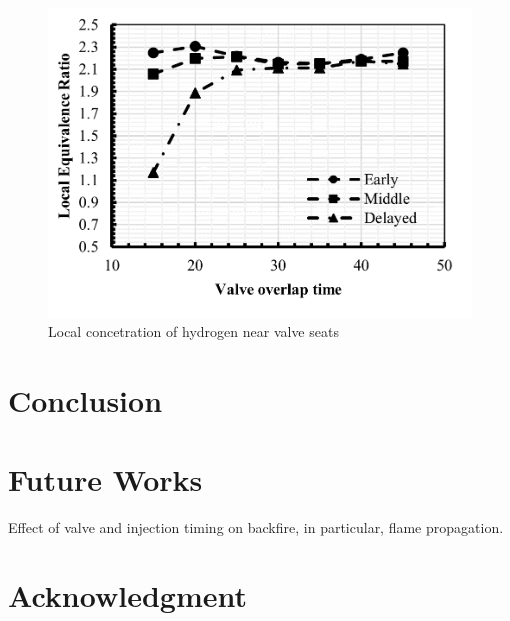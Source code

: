\documentclass[conference]{IEEEtran}
\begin{document}
    \begin{figure}[htbp]
        \centerline{\includegraphics{plots and graphs/6.png}}
        \caption{Local concetration of hydrogen near valve seats}
        \label{plt_6}
        \end{figure}
    

\section{Conclusion}

\section{Future Works}
Effect of valve and injection timing on backfire, in particular, flame propagation.

\section*{Acknowledgment}
\end{document}
